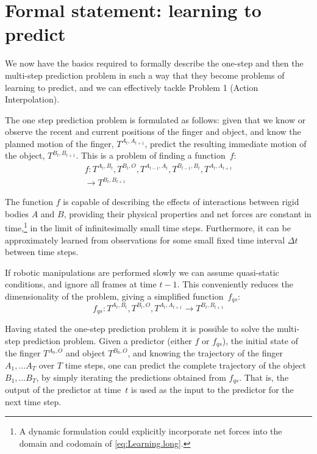 

\section{Formal statement: learning to predict}
\label{sec:PredictionProblem}

We now have the basics required to formally describe the one-step and then the multi-step prediction
problem in such a way that they become problems of learning to predict, and we can effectively tackle Problem 1 (Action Interpolation).

 The one step prediction problem is formulated as follows:
given that we know or observe the recent and current positions of the finger and object, and know the planned motion of the finger, $T^{A_{t},  A_{t+1}}$, predict the resulting immediate motion of the object,
$T^{B_{t}, B_{t+1}}$.  This is a problem of finding a function~$f$:
\begin{multline}
f: T^{A_t, B_t}, T^{B_t, O}, T^{A_{t-1}, A_{t}}, T^{B_{t-1}, B_{t}}, T^{A_{t}, A_{t+1}} \\ \longrightarrow T^{B_{t}, B_{t+1}}
\label{eq:Learning.long}
\end{multline}

The function $f$ is capable of describing the effects of interactions between rigid bodies $A$ and $B$, providing their physical properties and net forces are constant
in time,\footnote{A dynamic formulation could explicitly incorporate
net forces into the domain and codomain of \eqref{eq:Learning.long}.}
in the limit of infinitesimally small time steps.
Furthermore, it can be approximately learned from observations
for some small fixed time interval $\Delta t$ between time steps.

If robotic manipulations are performed slowly we can assume quasi-static conditions, and ignore all frames at time $t-1$.  This conveniently reduces the dimensionality of the problem, giving a simplified function~$f_{qs}$:
\begin{equation}
f_{qs}: T^{A_t, B_t}, T^{B_t, O}, T^{A_{t}, A_{t+1}} \longrightarrow T^{B_{t}, B_{t+1}}
\label{eq:Learning.short}
\end{equation}

 Having stated the one-step prediction problem it is possible to solve
the multi-step prediction problem. Given a predictor (either $f$ or
$f_{qs}$), the initial state of the finger $T^{A_{0}, O}$ and object
$T^{B_{0}, O}$, and knowing the trajectory of the finger $A_{1},
\ldots A_{T}$ over $T$ time steps, one can predict the complete
trajectory of the object $B_{1}, \ldots B_{T}$, by simply iterating
the predictions obtained from $f_{qs}$.  That is, the output of the
predictor at time~$t$ is used as the input to the predictor for the
next time step.

